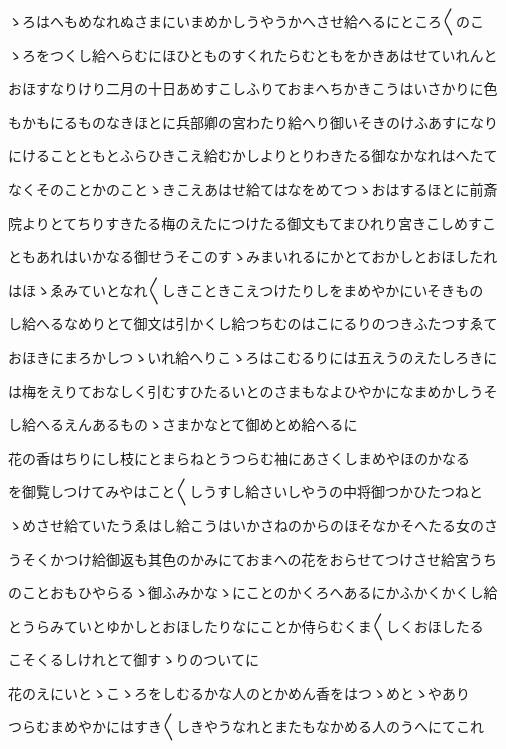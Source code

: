 \documentclass[a4paper,11pt,landscape]{ltjtarticle}
\begin{document}
\par\medskip
ゝろはへもめなれぬさまにいまめかしうやうかへさせ給へるにところ〱のこ
\par\medskip
ゝろをつくし給へらむにほひとものすくれたらむともをかきあはせていれんと
\par\medskip
おほすなりけり二月の十日あめすこしふりておまへちかきこうはいさかりに色
\par\medskip
もかもにるものなきほとに兵部卿の宮わたり給へり御いそきのけふあすになり
\par\medskip
にけることともとふらひきこえ給むかしよりとりわきたる御なかなれはへたて
\par\medskip
なくそのことかのことゝきこえあはせ給てはなをめてつゝおはするほとに前斎
\par\medskip
院よりとてちりすきたる梅のえたにつけたる御文もてまひれり宮きこしめすこ
\par\medskip
ともあれはいかなる御せうそこのすゝみまいれるにかとておかしとおほしたれ
\par\medskip
はほゝゑみていとなれ〱しきこときこえつけたりしをまめやかにいそきもの
\par\medskip
し給へるなめりとて御文は引かくし給つちむのはこにるりのつきふたつすゑて
\par\medskip
おほきにまろかしつゝいれ給へりこゝろはこむるりには五えうのえたしろきに
\par\medskip
は梅をえりておなしく引むすひたるいとのさまもなよひやかになまめかしうそ
\par\medskip
し給へるえんあるものゝさまかなとて御めとめ給へるに
\par\medskip
花の香はちりにし枝にとまらねとうつらむ袖にあさくしまめやほのかなる
\par\medskip
を御覧しつけてみやはこと〱しうすし給さいしやうの中将御つかひたつねと
\par\medskip
ゝめさせ給ていたうゑはし給こうはいかさねのからのほそなかそへたる女のさ
\par\medskip
うそくかつけ給御返も其色のかみにておまへの花をおらせてつけさせ給宮うち
\par\medskip
のことおもひやらるゝ御ふみかなゝにことのかくろへあるにかふかくかくし給
\par\medskip
とうらみていとゆかしとおほしたりなにことか侍らむくま〱しくおほしたる
\par\medskip
こそくるしけれとて御すゝりのついてに
\par\medskip
花のえにいとゝこゝろをしむるかな人のとかめん香をはつゝめとゝやあり
\par\medskip
つらむまめやかにはすき〱しきやうなれとまたもなかめる人のうへにてこれ
\end{document}
